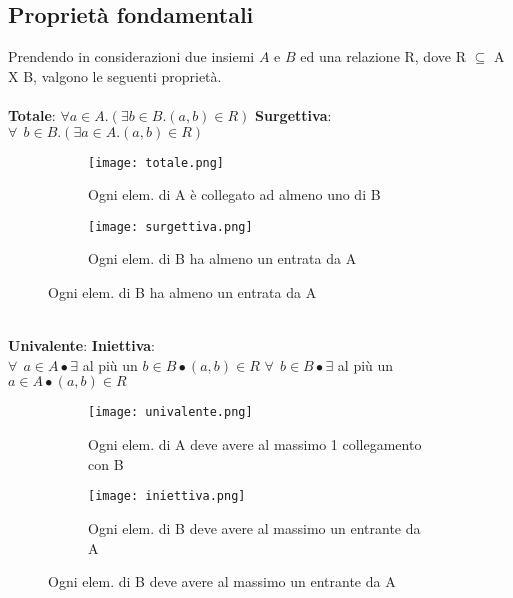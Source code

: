 \subsection{Proprietà fondamentali}
Prendendo in considerazioni due insiemi $A$ e $B$ ed una relazione R, dove R $\subseteq$ A X B, valgono le seguenti proprietà.\\ \\
\textbf{Totale}: $\forall a \in A . (\exists b \in B . (a, b) \in R)$
\hfill
\textbf{Surgettiva}: $\forall \: \: b \in B . (\exists a \in A . (a, b) \in R)$
\begin{figure}[h!]
    \vspace{-8pt}
    \begin{subfigure}{.3\textwidth}
        \centering
        \texttt{[image: totale.png]}
        \caption{Ogni elem. di A è collegato ad almeno uno di B}
    \end{subfigure}
    \hspace{4.3cm}
    \begin{subfigure}{.3\textwidth}
        \centering
        \texttt{[image: surgettiva.png]}
        \caption{Ogni elem. di B ha almeno un entrata da A}
    \end{subfigure}
\end{figure}
\\
\textbf{Univalente}: \hspace{6.3cm} \textbf{Iniettiva}:
\\
$\forall \: \: a \in A \bullet \exists$ al più un $b \in B \bullet (a, b) \in R$
\hspace{2.4cm} 
$\forall \: \: b \in B \bullet \exists$ al più un $a \in A \bullet (a, b) \in R$
\begin{figure}[h!]
    \vspace{-7pt}
    \begin{subfigure}{.3\textwidth}
        \centering
        \texttt{[image: univalente.png]}
        \caption{Ogni elem. di A deve avere al massimo 1 collegamento con B}
    \end{subfigure}
    \hspace{4.3cm}
    \begin{subfigure}{.3\textwidth}
        \centering
        \texttt{[image: iniettiva.png]}
        \caption{Ogni elem. di B deve avere al massimo un entrante da A}
    \end{subfigure}
\end{figure}
